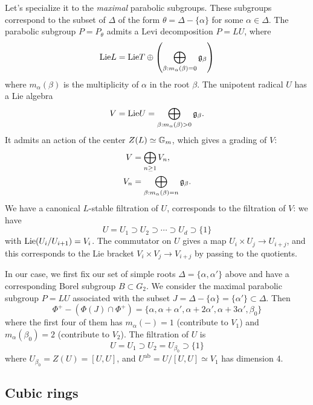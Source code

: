 Let's specialize it to the \emph{maximal} parabolic subgroups.
These subgroups correspond to the subset of $\Delta$ of the form $\theta = \Delta - \{\alpha\}$ for some $\alpha \in \Delta$.
The parabolic subgroup $P = P_\theta$ admits a Levi decomposition $P = LU$, where
$$
\mathrm{Lie} L = \mathrm{Lie} T \oplus \left(\bigoplus_{\beta: m_\alpha(\beta) = 0} \mathfrak{g}_\beta \right)
$$
where $m_\alpha(\beta)$ is the multiplicity of $\alpha$ in the root $\beta$.
The unipotent radical $U$ has a Lie algebra
$$
V = \mathrm{Lie} U = \bigoplus_{\beta: m_\alpha(\beta) > 0} \mathfrak{g}_\beta.
$$
It admits an action of the center $Z(L) \simeq \mathbb{G}_m$, which gives a grading of $V$:
\begin{align*}
    V &= \bigoplus_{n \ge 1} V_n, \\
    V_n &= \bigoplus_{\beta: m_\alpha(\beta) = n} \mathfrak{g}_\beta.
\end{align*}
We have a canonical $L$-stable filtration of $U$, corresponds to the filtration of $V$: we have
$$
U = U_1 \supset U_2 \supset \cdots \supset U_d \supset \{1\}
$$
with $\mathrm{Lie}(U_i / U_{i+1}) = V_i$. The commutator on $U$ gives a map $U_i \times U_j \to U_{i+j}$, and this corresponds to the Lie bracket $V_i \times V_j \to V_{i+j}$ by passing to the quotients.

In our case, we first fix our set of simple roots $\Delta = \{\alpha, \alpha'\}$ above and have a corresponding Borel subgroup $B \subset G_2$.
We consider the maximal parabolic subgroup $P = LU$ associated with the subset $J = \Delta - \{\alpha\} = \{\alpha'\} \subset \Delta$.
Then
$$
\Phi^+ - (\Phi(J) \cap \Phi^+) = \{\alpha, \alpha + \alpha', \alpha + 2 \alpha', \alpha + 3 \alpha', \beta_0\}
$$
where the first four of them has $m_\alpha(-) = 1$ (contribute to $V_1$) and $m_\alpha(\beta_0) = 2$ (contribute to $V_2$).
The filtration of $U$ is
$$
U = U_1 \supset U_2 = U_{\beta_0} \supset \{1\}
$$
where $U_{\beta_0} = Z(U) = [U, U]$, and $U^{\mathrm{ab}} = U / [U, U] \simeq V_1$ has dimension 4.



\subsection{Cubic rings}

\label{subsec:cubicring}

